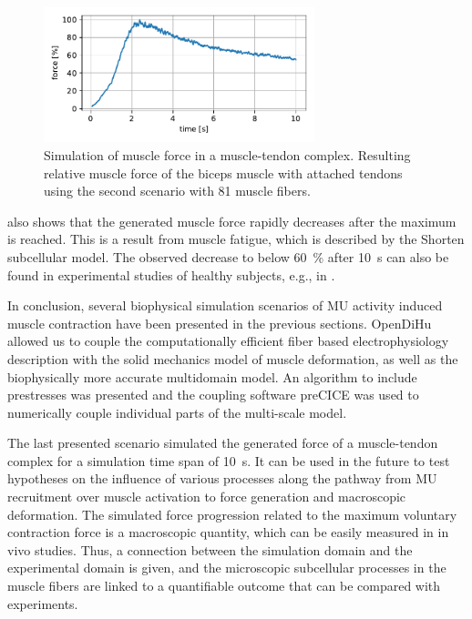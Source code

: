 \begin{figure}
  \centering%
  \includegraphics[width=0.7\textwidth]{images/results/application/precice_muscle_force.pdf}%
  \caption{Simulation of muscle force in a muscle-tendon complex. Resulting relative muscle force of the biceps muscle with attached tendons using the second scenario with 81 muscle fibers.}%
  \label{fig:precice_muscle_force0}%
\end{figure}

 also shows that the generated muscle force rapidly decreases after the maximum is reached. This is a result from muscle fatigue, which is described by the Shorten subcellular model. The observed decrease to below \SI{60}{\percent} after \SI{10}{\s} can also be found in experimental studies of healthy subjects, e.g., in \cite{Enoka2008}. 

In conclusion, several biophysical simulation scenarios of MU activity induced muscle contraction have been presented in the previous sections. OpenDiHu allowed us to couple the computationally efficient fiber based electrophysiology description with the solid mechanics model of muscle deformation, as well as the biophysically more accurate multidomain model. An algorithm to include prestresses was presented and the coupling software preCICE was used to numerically couple individual parts of the multi-scale model. 

The last presented scenario simulated the generated force of a muscle-tendon complex for a simulation time span of \SI{10}{\s}. 
It can be used in the future to test hypotheses on the influence of various processes along the pathway from MU recruitment over muscle activation to force generation and macroscopic deformation. The simulated force progression related to the maximum voluntary contraction force is a macroscopic quantity, which can be easily measured in in vivo studies. Thus, a connection between the simulation domain and the experimental domain is given, and the microscopic subcellular processes in the muscle fibers are linked to a quantifiable outcome that can be compared with experiments.


